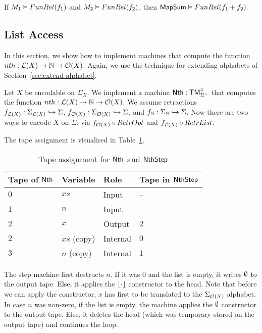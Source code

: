 \begin{lemma}
  \label{lem:MapSum_Computes}
  If $M_1 \mathrel{\vDash} FunRel(f_1)$ and $M_2 \mathrel{\vDash} FunRel(f_2)$, then $\mathsf{MapSum} \mathrel{\vDash} FunRel(f_1+f_2)$.
\end{lemma}


\subsection{List Access}
\label{sec:Nth}
%

In this section, we show how to implement machines that compute the function $nth : \mathcal{L}(X) \rightarrow \mathbb{N} \rightarrow \mathcal{O}(X)$.  Again, we use the technique
for extending alphabets of Section~\ref{sec:extend-alphabet}.

Let $X$ be encodable on $\Sigma_X$.  We implement a machine $\mathsf{Nth} : \mathsf{TM}_{\Sigma^+}^4$ that computes the function
$nth : \mathcal{L}(X) \rightarrow \mathbb{N} \rightarrow \mathcal{O}(X)$.  We assume retractions $f_{\mathcal{L}(X)} : \Sigma_{\mathcal{L}(X)} \hookrightarrow \Sigma$,
$f_{\mathcal{O}(X)} : \Sigma_{\mathcal{O}(X)} \hookrightarrow \Sigma$, and $f_{\mathbb{N}} : \Sigma_{\mathbb{N}} \hookrightarrow \Sigma$.  Now there are two ways to encode
$X$ on $\Sigma$: via $f_{\mathcal{O}(X)} \circ RetrOpt$ and $f_{\mathcal{L}(X)} \circ RetrList$.

The tape assignment is visualised in Table~\ref{tab:tapes-Nth}.

\begin{table}[!htb]
  \centering
  \begin{tabular}{l|l|l|l}
    Tape of $\mathsf{Nth}$ & Variable & Role & Tape in $\mathsf{NthStep}$ \\ \hline
    $0$ & $xs$         & Input    & --  \\
    $1$ & $n$          & Input    & --  \\
    $2$ & $x$          & Output   & $2$ \\
    $2$ & $xs$ (copy)  & Internal & $0$ \\
    $3$ & $n$ (copy)   & Internal & $1$ \\
  \end{tabular}
  \caption{Tape assignment for $\mathsf{Nth}$ and $\mathsf{NthStep}$}
  \label{tab:tapes-Nth}
\end{table}


The step machine first destructs $n$.  If it was $0$ and the list is empty, it writes $\emptyset$ to the output tape.  Else, it applies the $\left\lfloor {\cdot} \right\rfloor$
constructor to the head.  Note that before we can apply the constructor, $x$ has first to be translated to the $\Sigma_{\mathcal{O}(X)}$ alphabet.  In
case $n$ was non-zero, if the list is empty, the machine applies the $\emptyset$ constructor to the output tape.  Else, it deletes the head (which was
temporary stored on the output tape) and continues the loop.

